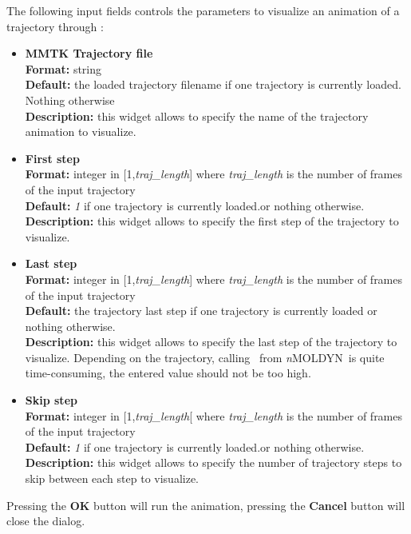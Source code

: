 \documentclass[a4paper,11pt]{report}
\newcommand{\NMOLDYN}{\textit{n}MOLDYN}
\begin{document}
The following input fields controls the parameters to visualize an animation of a trajectory through \VMD :

\begin{itemize}
\item \textbf{MMTK Trajectory file}\\
\textbf{Format:} string\\
\textbf{Default:} the loaded trajectory filename if one trajectory is currently loaded. Nothing otherwise\\
\textbf{Description:} this widget allows to specify the name of the trajectory animation to visualize.

\item \textbf{First step}\\
\textbf{Format:} integer in [1,\textit{traj\_length}] where \textit{traj\_length} is the number of frames of the input trajectory\\
\textbf{Default:} \textit{1} if one trajectory is currently loaded.or nothing otherwise.\\
\textbf{Description:} this widget allows to specify the first step of the trajectory to visualize.

\item \textbf{Last step}\\
\textbf{Format:} integer in [1,\textit{traj\_length}] where \textit{traj\_length} is the number of frames of the input trajectory\\
\textbf{Default:} the trajectory last step if one trajectory is currently loaded or nothing otherwise.\\
\textbf{Description:} this widget allows to specify the last step of the trajectory to visualize. Depending on the 
trajectory, calling \VMD\ from \NMOLDYN\ is quite time-consuming, the entered value should not be too high.

\item \textbf{Skip step}\\
\textbf{Format:} integer in [1,\textit{traj\_length}[ where \textit{traj\_length} is the number of frames of the input trajectory\\
\textbf{Default:} \textit{1} if one trajectory is currently loaded.or nothing otherwise.\\
\textbf{Description:} this widget allows to specify the number of trajectory steps to skip between each step to visualize.
\end{itemize}
Pressing the \textbf{OK} button will run the animation, pressing the \textbf{Cancel} button will close the dialog.
\end{document}
